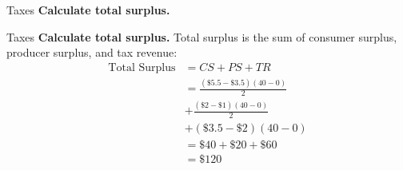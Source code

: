 \documentclass{beamer}
\begin{document}
\begin{frame}[t]{Taxes}
    \textbf{Calculate total surplus.}
\end{frame}

\begin{frame}[t]{Taxes}
    \textbf{Calculate total surplus.}
    \newline
    \newline Total surplus is the sum of consumer surplus, producer surplus, and tax revenue:
    \[\begin{split}
        \text{Total Surplus} &= CS + PS + TR \\
        &= \frac{(\$5.5-\$3.5)(40-0)}{2} \\
        &+ \frac{(\$2 - \$1)(40-0)}{2} \\
        &+ (\$3.5 - \$2)(40-0) \\
        &= \$40 + \$20 + \$60 \\
        &= \boxed{\$120}
    \end{split}\]
\end{frame}


\end{document}
